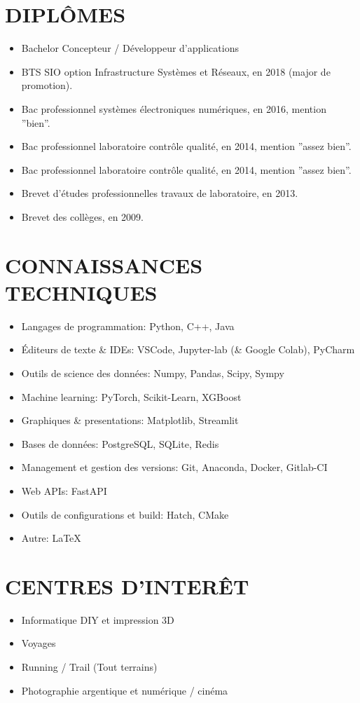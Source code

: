 \documentclass[a4paper,twoside]{article}
\begin{document}
\begin{multicols}{2}
    \section*{DIPLÔMES}
    \begin{itemize}
        \item Bachelor Concepteur / Développeur d’applications
        \item BTS SIO option Infrastructure Systèmes et Réseaux, en 2018 (major de promotion).
        \item Bac professionnel systèmes électroniques numériques, en 2016, mention ''bien''.
        \item Bac professionnel laboratoire contrôle qualité, en 2014, mention ''assez bien''.
        \item Bac professionnel laboratoire contrôle qualité, en 2014, mention ''assez bien''.
        \item Brevet d'études professionnelles travaux de laboratoire, en 2013.
        \item Brevet des collèges, en 2009.
    \end{itemize}

    \section*{CONNAISSANCES
      \newline TECHNIQUES}

    \begin{itemize}
        \item Langages de programmation: Python, C++, Java
        \item Éditeurs de texte \& IDEs: VSCode, Jupyter-lab (\& Google Colab), PyCharm
        \item Outils de science des données: Numpy, Pandas, Scipy, Sympy
        \item Machine learning: PyTorch, Scikit-Learn, XGBoost
        \item Graphiques \& presentations: Matplotlib, Streamlit
        \item Bases de données: PostgreSQL, SQLite, Redis
        \item Management et gestion des versions: Git, Anaconda, Docker, Gitlab-CI
        \item Web APIs: FastAPI
        \item Outils de configurations et build: Hatch, CMake
        \item Autre: LaTeX
    \end{itemize}

    \section*{CENTRES D'INTERÊT}

    \begin{itemize}
        \item Informatique DIY et impression 3D
        \item Voyages
        \item Running / Trail (Tout terrains)
        \item Photographie argentique et numérique / cinéma
    \end{itemize}

\end{multicols}
\end{document}
